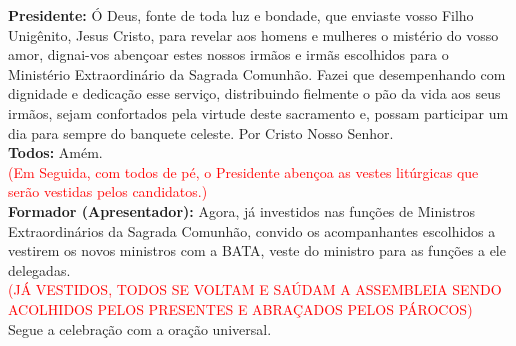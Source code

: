 \documentclass{book}
\begin{document}
\begin{flushleft}
    \textbf{Presidente:} Ó Deus, fonte de toda luz e bondade, que enviaste vosso Filho Unigênito, Jesus Cristo, para revelar aos homens e mulheres o mistério do vosso amor, dignai-vos abençoar estes nossos irmãos e irmãs escolhidos para o Ministério Extraordinário da Sagrada Comunhão. Fazei que desempenhando com dignidade e dedicação esse serviço, distribuindo fielmente o pão da vida aos seus irmãos, sejam confortados pela virtude deste sacramento e, possam participar um dia para sempre do banquete celeste. Por Cristo Nosso Senhor.
    \vspace{.1cm} \\
    \textbf{Todos:} Amém.
    \vspace{.1cm} \\
    \textcolor{red}{(Em Seguida, com todos de pé, o Presidente abençoa as vestes litúrgicas que serão vestidas pelos candidatos.)}
    \vspace{.1cm} \\
    \textbf{Formador (Apresentador):} Agora, já investidos nas funções de Ministros Extraordinários da Sagrada Comunhão, convido os acompanhantes escolhidos a vestirem os novos ministros com a BATA, veste do ministro para as funções a ele delegadas.
    \vspace{.1cm} \\
    \textcolor{red}{(JÁ VESTIDOS, TODOS SE VOLTAM E SAÚDAM A ASSEMBLEIA SENDO ACOLHIDOS PELOS PRESENTES E ABRAÇADOS PELOS PÁROCOS)}
    \vspace{.1cm} \\
    Segue a celebração com a oração universal.
\end{flushleft}
\end{document}
